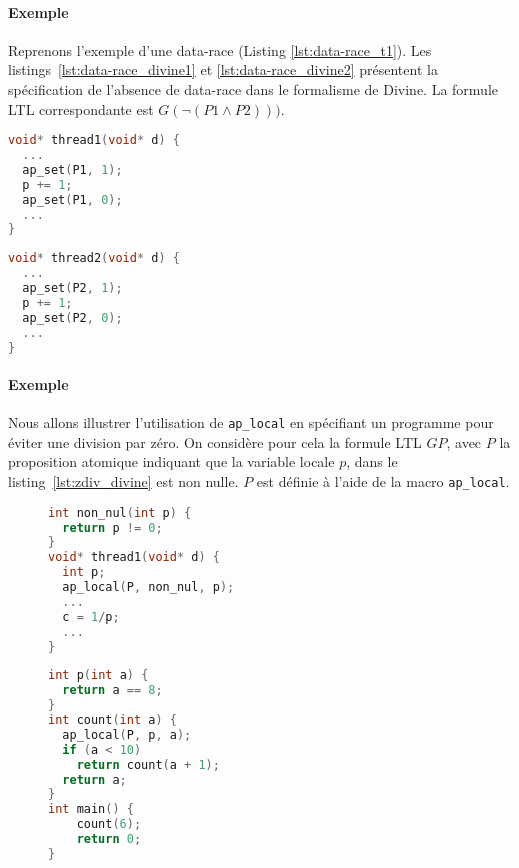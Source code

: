 \paragraph{Exemple}
Reprenons l'exemple d'une data-race (Listing \ref{lst:data-race_t1}). Les
listings~\ref{lst:data-race_divine1} et \ref{lst:data-race_divine2} présentent
la spécification de l'absence de data-race dans le formalisme de Divine. La
formule \ac{LTL} correspondante est \(G(\lnot (P1 \land P2)))\).

\noindent\begin{minipage}{.45\textwidth}
  \begin{lstlisting}[language=C, frame=single, caption=Thread 1,
    label=lst:data-race_divine1]
void* thread1(void* d) {
  ...
  ap_set(P1, 1);
  p += 1;
  ap_set(P1, 0);
  ...
}
\end{lstlisting}
\end{minipage}\hfill
\begin{minipage}{.45\textwidth}
\begin{lstlisting}[language=C, frame=single, caption=Thread 2,
    label=lst:data-race_divine2]
void* thread2(void* d) {
  ...
  ap_set(P2, 1);
  p += 1;
  ap_set(P2, 0);
  ...
}
\end{lstlisting}
\end{minipage}

\paragraph{Exemple}
Nous allons illustrer l'utilisation de \texttt{ap\_local} en spécifiant un
programme pour éviter une division par zéro. On considère pour cela la formule
\ac{LTL} \(G P\), avec \(P\) la proposition atomique indiquant que la variable
locale \(p\), dans le listing~\ref{lst:zdiv_divine} est non nulle. \(P\) est
définie à l'aide de la macro \texttt{ap\_local}.

\begin{figure}
\noindent\begin{minipage}[t]{.45\textwidth}
  \begin{lstlisting}[language=C, frame=single, caption=\texttt{ap\_local},
    label=lst:zdiv_divine]
int non_nul(int p) {
  return p != 0;
}
void* thread1(void* d) {
  int p;
  ap_local(P, non_nul, p);
  ...
  c = 1/p;
  ...
}
\end{lstlisting}
\end{minipage}\hfill
\begin{minipage}[t]{.45\textwidth}
\begin{lstlisting}[frame=single, language=C, caption=Fonction récursive,
  label=lst:divine-rec]
int p(int a) {
  return a == 8;
}
int count(int a) {
  ap_local(P, p, a);
  if (a < 10)
    return count(a + 1);
  return a;
}
int main() {
    count(6);
    return 0;
}
\end{lstlisting}
\end{minipage}
\end{figure}

